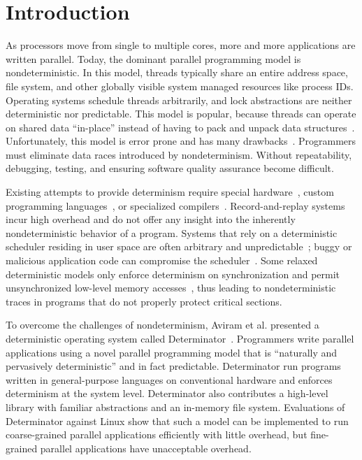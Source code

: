 
\begin{abstract}
[to be done]
\end{abstract}

\section{Introduction}
As processors move from single to multiple cores, more and more applications are
written parallel. Today, the dominant parallel programming model is
nondeterministic. In this model, threads typically share an entire address
space, file system, and other globally visible system managed resources like
process IDs. Operating systems schedule threads arbitrarily, and
lock abstractions are neither deterministic nor predictable. This model is
popular, because threads can operate on shared data ``in-place'' instead of
having to pack and unpack data structures~\cite{Aviram10}. Unfortunately, this
model is error prone and has many drawbacks~\cite{artho2003high,lee2006problem,
lu2008learning}. Programmers must eliminate data races introduced by
nondeterminism. Without repeatability, debugging, testing, and ensuring
software quality assurance become difficult.

Existing attempts to provide determinism require
special hardware~\cite{Devietti09,devietti2011rcdc}, custom programming
languages~\cite{bocchino2009type}, or specialized
compilers~\cite{bergan2010coredet}. Record-and-replay
systems~\cite{leblanc1987debugging,montesinos2008delorean} incur high
overhead and do not offer any insight into the inherently nondeterministic
behavior of a program. Systems that rely on a deterministic
scheduler residing in user space are often arbitrary and
unpredictable~\cite{olszewski2009kendo}; buggy or malicious application code
can compromise the scheduler~\cite{Aviram10,cui2010stable}.  Some relaxed
deterministic models only enforce determinism on synchronization and permit
unsynchronized low-level memory accesses~\cite{olszewski2009kendo}, thus leading
to nondeterministic traces in programs that do not properly protect critical
sections.

To overcome the challenges of nondeterminism, Aviram et al. presented a
deterministic operating system called Determinator~\cite{Aviram10}.
Programmers write parallel applications using a novel parallel programming model
that is ``naturally and pervasively deterministic'' and in fact predictable.
Determinator run programs written in general-purpose languages on
conventional hardware and enforces determinism at the system level.
Determinator also contributes a high-level library with familiar abstractions
and an in-memory file system.
Evaluations of Determinator against Linux show that such a model can be
implemented to run coarse-grained parallel applications efficiently with little
overhead, but fine-grained parallel applications have unacceptable overhead.

